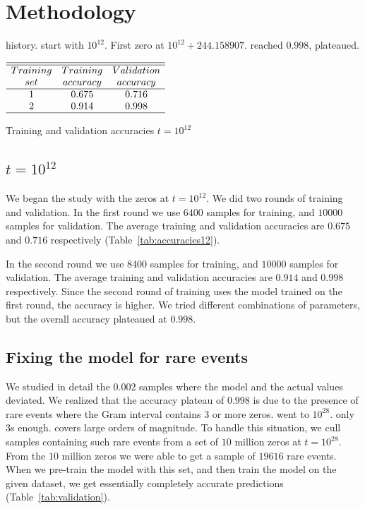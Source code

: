 \documentclass[journal]{IEEEtai}
\begin{document}
\section{Methodology}

history. start with $10^{12}$. First zero   at $10^{12} + 244.158907$. reached 0.998, plateaued. 


\begin{table}
\centering \(\begin{array}{ccc}
\hline
\hline
Training  & Training &Validation  \\
set     &accuracy&accuracy\\
\hline
1  & 0.675 & 0.716 \\

2  & 0.914 & 0.998 \\
\hline
\end{array}\)
\caption{Training and validation accuracies $t=10^{12}$}
\label{tab:accuracies12}
\end{table}

\subsection{\label{10E12} $t=10^{12}$}

We began the study with the zeros at $t=10^{12}$.
We did two rounds of training and validation. In the first round we use $6400$ samples for training, and $10000$ samples for validation.   The average training and validation accuracies are $0.675$ and $0.716$ respectively (Table~\ref{tab:accuracies12}).

In the second round we use $8400$ samples for training, and $10000$ samples for validation. The average training and validation accuracies are $0.914$ and $0.998$ respectively. Since the second round of training uses the model trained on the first round, the accuracy is higher. We tried different combinations of parameters, but the overall accuracy plateaued at $0.998$.


\subsection{\label{rarefix}Fixing the model for rare events}
We studied in detail the $0.002$ samples where the model and the actual values deviated. 
We realized that the accuracy plateau of $0.998$ is due to the presence of rare events where the Gram interval contains $3$ or more zeros. went to $10^{28}$. only 3s enough. covers large orders of magnitude. To handle this situation, we cull samples containing such rare events from a set of $10$ million zeros at $t=10^{28}$. From the $10$ million zeros we were able to get a sample of $19616$ rare events. When we pre-train the model with this set, and then train the model on the given dataset, we get essentially completely accurate predictions (Table~\ref{tab:validation}).
\end{document}
